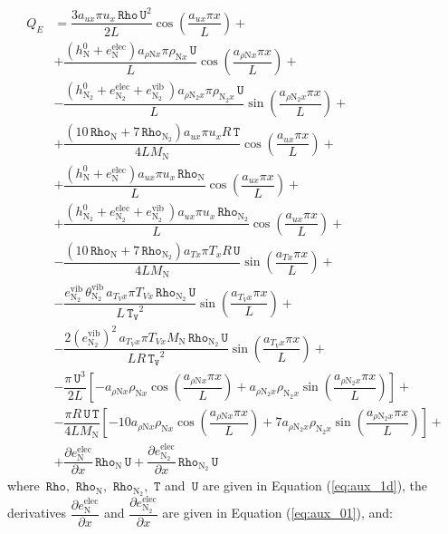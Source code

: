 \documentclass[10pt]{article}
\newcommand{\diff}[2] {\dfrac{\partial #1 }{\partial #2}}
\newcommand{\Rho}{\,\mathtt{Rho}}
\newcommand{\T}{\,\mathtt{T}}
\newcommand{\U}{\,\mathtt{U}}
\newcommand{\TV}{\,\mathtt{T_V}}
\newcommand{\N}{\text{N}}
\newcommand{\elec}{\text{elec}}
\newcommand{\vib}{\text{vib}}
\begin{document}
\begin{equation}
\begin{split}
Q_E &= \dfrac{3 a_{ux} \pi u_x \Rho \U^2 }{2L} \cos\left(\dfrac{a_{ux} \pi x}{L}\right) +\\ 
&+\dfrac{(h_{\N}^0+e_{\N}^{\elec}) a_{  \rho \N x } \pi \rho_{\N x} \U }{L} \cos\left(\dfrac{a_{  \rho \N x } \pi x}{L}\right) +\\ &-\dfrac{(h_{\N_2}^0+e_{\N_2}^{\elec}+e_{\N_2}^{\vib} \, ) a_{  \rho \N_2 x } \pi \rho_{\N_2 x} \U }{L} \sin\left(\dfrac{a_{  \rho \N_2 x } \pi x}{L}\right)  +\\ &+\dfrac{ (10 \Rho_{\N}+7 \Rho_{\N_2}) a_{ux} \pi u_x R \T  }{4L M_\N} \cos\left(\dfrac{a_{ux} \pi x}{L}\right)+\\ 
&+\dfrac{(h_{\N}^0+e_{\N}^{\elec}) a_{ux} \pi u_x \Rho_{\N}}{L} \cos\left(\dfrac{a_{ux} \pi x}{L}\right)  +\\ 
&+\dfrac{(h_{\N_2}^0+e_{\N_2}^{\elec}+e_{\N_2}^{\vib} \, ) a_{ux} \pi u_x \Rho_{\N_2} }{L}\cos\left(\dfrac{a_{ux} \pi x}{L}\right) +\\ 
&-\dfrac{ (10 \Rho_{\N}+7 \Rho_{\N_2}) a_{Tx} \pi T_x R \U }{4L M_\N}\sin\left(\dfrac{a_{Tx} \pi x}{L}\right)  +\\ 
&-\dfrac{e_{\N_2}^{\vib} \, \theta^{\vib}_{\N_2} \,   a_{T_V x} \pi T_{Vx} \Rho_{\N_2} \U }{L \TV^2}\sin\left(\dfrac{a_{T_V x} \pi x}{L}\right) +\\
&-\dfrac{2 (e_{\N_2}^{\vib})^2 \, a_{T_V x} \pi T_{Vx} M_\N \Rho_{\N_2} \U }{L R \TV^2}\sin\left(\dfrac{a_{T_V x} \pi x}{L}\right) +\\
&-\dfrac{ \pi \U^3 }{2L}\left[-a_{  \rho \N x } \rho_{\N x} \cos\left(\dfrac{a_{  \rho \N x } \pi x}{L}\right) +a_{  \rho \N_2 x } \rho_{\N_2 x} \sin\left(\dfrac{a_{  \rho \N_2 x } \pi x}{L}\right) \right]  +\\ 
&-\dfrac{\pi R \U \T}{4L M_\N} \left[-10 a_{  \rho \N x } \rho_{\N x} \cos\left(\dfrac{a_{  \rho \N x } \pi x}{L}\right) +7 a_{  \rho \N_2 x } \rho_{\N_2 x} \sin\left(\dfrac{a_{  \rho \N_2 x } \pi x}{L}\right) \right]  +\\ 
&+\diff{e_{\N}^{\elec}}{x} \Rho_{\N} \U+\diff{e_{\N_2}^{\elec}}{x} \Rho_{\N_2} \U
\end{split}
\end{equation}
where $\Rho,\,\Rho_{\text{N}},\,\Rho_{\text{N}_2},\, \T$ and $\U$ are given  in Equation (\ref{eq:aux_1d}), the derivatives $\diff{e_{\N}^{\elec}}{x}$ and $\diff{e_{\N_2}^{\elec}}{x}$ are given in Equation (\ref{eq:aux_01}), and:
\end{document}
